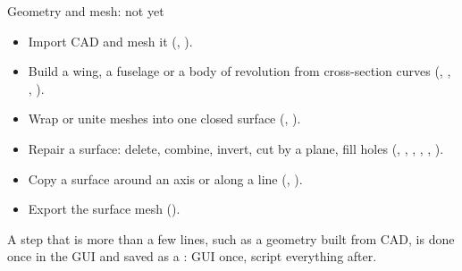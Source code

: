 \begin{frame}{Geometry and mesh: not yet}
\begin{itemize}\small
  \item Import CAD and mesh it (, ).
  \item Build a wing, a fuselage or a body of revolution from cross-section curves (, , , ).
  \item Wrap or unite meshes into one closed surface (, ).
  \item Repair a surface: delete, combine, invert, cut by a plane, fill holes (, , , , , ).
  \item Copy a surface around an axis or along a line (, ).
  \item Export the surface mesh ().
\end{itemize}
\begin{takeaway}
A step that is more than a few lines, such as a geometry built from CAD, is done once in the GUI and saved as a : GUI once, script everything after.
\end{takeaway}
\end{frame}
